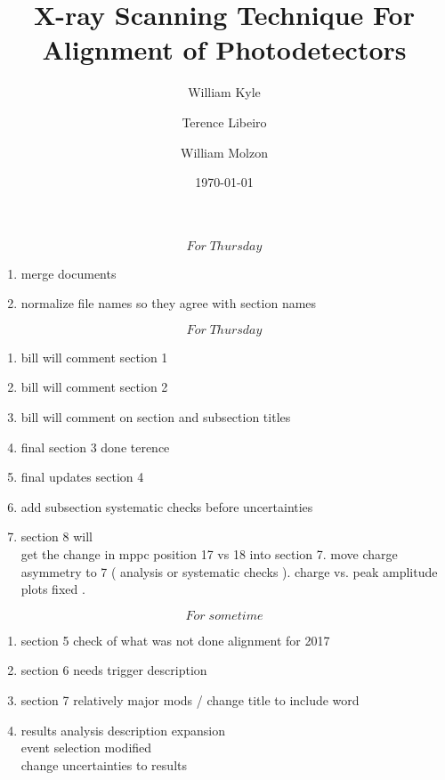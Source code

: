 \documentclass[preprint,5p]{elsarticle} %
\begin{document}
\date{\today}%

\begin{frontmatter}
\title{X-ray Scanning Technique For Alignment of Photodetectors}
\author[uci]{William Kyle}
\author[uci]{Terence Libeiro}
\author[uci]{William Molzon}
\address[uci]{University of California, Irvine}

\begin{abstract}

\end{abstract}
\end{frontmatter}
\tableofcontents

\[For\; Thursday \]
 \begin{enumerate}
    \item merge documents 
    \item normalize file names so they agree with section names 
\end{enumerate}
    

\[For\; Thursday \]
\begin{enumerate}
    \item bill will comment section 1 
    \item bill will comment section 2 
    \item bill will comment on section and subsection titles
    \item final section 3 done terence 
    \item final updates section 4 
    \item add subsection systematic checks before uncertainties 
    \item section 8  will \\
        get the change in mppc position 17 vs 18 into section 7. 
        move charge asymmetry to 7 ( analysis or systematic checks ). 
        charge vs. peak amplitude plots fixed .
\end{enumerate}
    
    
    

    
    
    
    
    
         
\[For\; sometime\]
\begin{enumerate}
  \item  section 5 check of what was not done alignment for 2017 
  \item section 6 needs trigger description 
  \item  section 7 relatively major mods / change title to include word \item results 
        analysis description expansion \\
        event selection modified \\
        
        change uncertainties to results 
        
\end{enumerate}    
    
\end{document}
